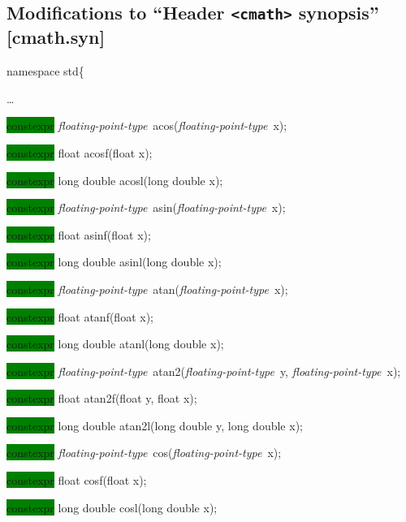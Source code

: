 \documentclass[prd,twocolumn,amsmath,amssymb,nofootinbib,eqsecnum]{revtex4-1}
\newcommand{\code}[1]{{\tt #1}}
\newcommand{\header}[1]{{\tt <#1>}}
\newcommand{\highlight}[1]{\colorbox{green}{\!\!\!\! #1}}
\newcommand{\fptype}{{\it floating-point-type}}
\begin{document}
\subsection{Modifications to  ``Header \header{cmath} synopsis'' [cmath.syn]}


\code{

namespace std\{

\vspace{2ex}
\ldots
\vspace{2ex}


\highlight{constexpr} \fptype\ acos(\fptype\ x);

\highlight{constexpr} float acosf(float x);

\highlight{constexpr} long double acosl(long double x);

\vspace{2ex}


\highlight{constexpr} \fptype\ asin(\fptype\ x);

\highlight{constexpr} float asinf(float x);

\highlight{constexpr} long double asinl(long double x);

\vspace{2ex}


\highlight{constexpr} \fptype\ atan(\fptype\ x);

\highlight{constexpr} float atanf(float x);

\highlight{constexpr} long double atanl(long double x);

\vspace{2ex}


\highlight{constexpr} \fptype\ atan2(\fptype\ y, \fptype\ x);

\highlight{constexpr} float atan2f(float y, float x);

\highlight{constexpr} long double atan2l(long double y, long double x);

\vspace{2ex}


\highlight{constexpr} \fptype\ cos(\fptype\ x);

\highlight{constexpr} float cosf(float x);

\highlight{constexpr} long double cosl(long double x);

\vspace{2ex}

}
\end{document}

